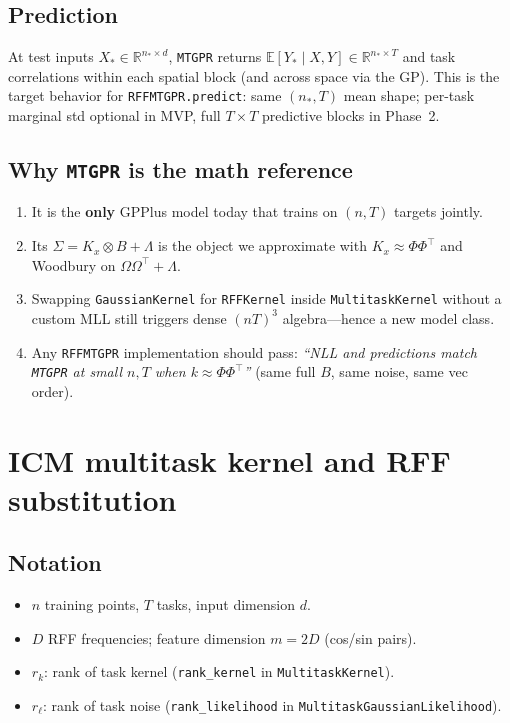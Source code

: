 \documentclass[11pt]{article}
\theoremstyle{plain}
\newcommand{\Sig}{\Sigma}
\newcommand{\Ph}{\Phi}
\newcommand{\Om}{\Omega}
\begin{document}
\subsection{Prediction}

At test inputs $X_\ast \in \mathbb{R}^{n_\ast \times d}$, \texttt{MTGPR} returns
$\mathbb{E}[Y_\ast \mid X, Y] \in \mathbb{R}^{n_\ast \times T}$ and task correlations
within each spatial block (and across space via the GP). This is the target behavior for
\texttt{RFFMTGPR.predict}: same $(n_\ast, T)$ mean shape; per-task marginal std optional in MVP,
full $T\times T$ predictive blocks in Phase~2.

\subsection{Why \texttt{MTGPR} is the math reference}

\begin{enumerate}[nosep]
  \item It is the \textbf{only} GPPlus model today that trains on $(n,T)$ targets jointly.
  \item Its $\Sig = K_x \otimes B + \Lambda$ is the object we approximate with
        $K_x \approx \Ph\Ph^\top$ and Woodbury on $\Om\Om^\top + \Lambda$.
  \item Swapping \texttt{GaussianKernel} for \texttt{RFFKernel} inside \texttt{MultitaskKernel}
        without a custom MLL still triggers dense $(nT)^3$ algebra---hence a new model class.
  \item Any \texttt{RFFMTGPR} implementation should pass:
        \emph{``NLL and predictions match \texttt{MTGPR} at small $n,T$ when
        $k \approx \Ph\Ph^\top$''} (same full $B$, same noise, same vec order).
\end{enumerate}

\section{ICM multitask kernel and RFF substitution}

\subsection{Notation}

\begin{itemize}[nosep]
  \item $n$ training points, $T$ tasks, input dimension $d$.
  \item $D$ RFF frequencies; feature dimension $m = 2D$ (cos/sin pairs).
  \item $r_k$: rank of task kernel (\texttt{rank\_kernel} in \texttt{MultitaskKernel}).
  \item $r_\ell$: rank of task noise (\texttt{rank\_likelihood} in \texttt{MultitaskGaussianLikelihood}).
\end{itemize}
\end{document}
